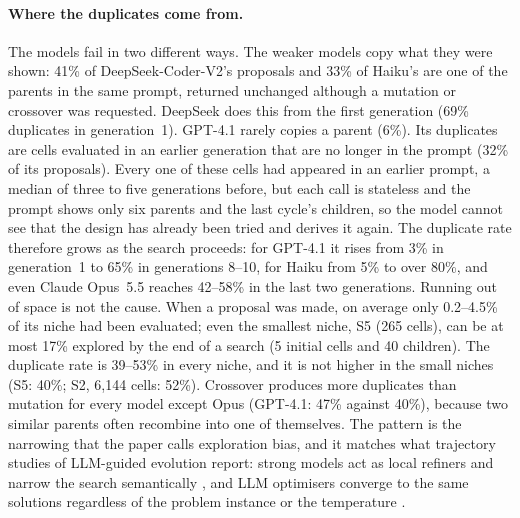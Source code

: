 \documentclass[11pt,a4paper]{article}
\begin{document}
\paragraph{Where the duplicates come from.} The models fail in two different ways. The weaker models copy what they were shown: 41\% of DeepSeek-Coder-V2's proposals and 33\% of Haiku's are one of the parents in the same prompt, returned unchanged although a mutation or crossover was requested. DeepSeek does this from the first generation (69\% duplicates in generation~1). GPT-4.1 rarely copies a parent (6\%). Its duplicates are cells evaluated in an earlier generation that are no longer in the prompt (32\% of its proposals). Every one of these cells had appeared in an earlier prompt, a median of three to five generations before, but each call is stateless and the prompt shows only six parents and the last cycle's children, so the model cannot see that the design has already been tried and derives it again. The duplicate rate therefore grows as the search proceeds: for GPT-4.1 it rises from 3\% in generation~1 to 65\% in generations 8--10, for Haiku from 5\% to over 80\%, and even Claude Opus~5.5 reaches 42--58\% in the last two generations. Running out of space is not the cause. When a proposal was made, on average only 0.2--4.5\% of its niche had been evaluated; even the smallest niche, S5 (265 cells), can be at most 17\% explored by the end of a search (5 initial cells and 40 children). The duplicate rate is 39--53\% in every niche, and it is not higher in the small niches (S5: 40\%; S2, 6{,}144 cells: 52\%). Crossover produces more duplicates than mutation for every model except Opus (GPT-4.1: 47\% against 40\%), because two similar parents often recombine into one of themselves. The pattern is the narrowing that the paper calls exploration bias, and it matches what trajectory studies of LLM-guided evolution report: strong models act as local refiners and narrow the search semantically \cite{zhang26traj}, and LLM optimisers converge to the same solutions regardless of the problem instance or the temperature \cite{redko26}.
\end{document}
